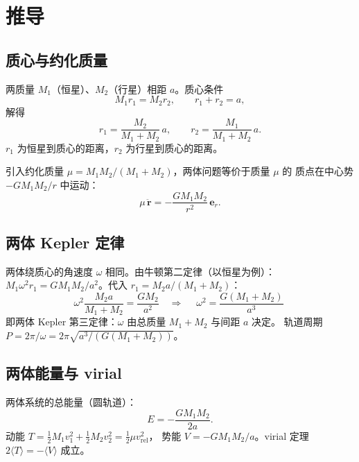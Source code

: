 \documentclass[UTF8,a4paper,11pt]{ctexart}
\begin{document}
\section{推导}
\label{sec:derive}

\subsection{质心与约化质量}
\label{sub:com}

两质量 $M_1$（恒星）、$M_2$（行星）相距 $a$。质心条件
\begin{equation}
  M_1 r_1 = M_2 r_2,\qquad r_1+r_2=a,
  \label{eq:com}
\end{equation}
解得
\begin{equation}
  r_1=\frac{M_2}{M_1+M_2}\,a,\qquad
  r_2=\frac{M_1}{M_1+M_2}\,a.
  \label{eq:r1r2}
\end{equation}
$r_1$ 为恒星到质心的距离，$r_2$ 为行星到质心的距离。

引入约化质量 $\mu=M_1M_2/(M_1+M_2)$，两体问题等价于质量 $\mu$ 的
质点在中心势 $-GM_1M_2/r$ 中运动：
\begin{equation}
  \mu\,\ddot{\boldsymbol r}=-\frac{GM_1M_2}{r^2}\,\boldsymbol e_r.
  \label{eq:reduced}
\end{equation}

\subsection{两体 Kepler 定律}
\label{sub:kepler2}

两体绕质心的角速度 $\omega$ 相同。由牛顿第二定律（以恒星为例）：
$M_1\omega^2 r_1 = GM_1M_2/a^2$。代入 $r_1=M_2 a/(M_1+M_2)$：
\begin{equation}
  \omega^2\frac{M_2 a}{M_1+M_2}=\frac{GM_2}{a^2}
  \quad\Longrightarrow\quad
  \boxed{\;\omega^2=\frac{G(M_1+M_2)}{a^3}\;}
  \label{eq:kepler2}
\end{equation}
即两体 Kepler 第三定律：$\omega$ 由总质量 $M_1+M_2$ 与间距 $a$ 决定。
轨道周期 $P=2\pi/\omega=2\pi\sqrt{a^3/(G(M_1+M_2))}$。

\subsection{两体能量与 virial}
\label{sub:energy2}

两体系统的总能量（圆轨道）：
\begin{equation}
  E = -\frac{GM_1M_2}{2a}.
\end{equation}
动能 $T=\frac12 M_1 v_1^2+\frac12 M_2 v_2^2
=\frac12 \mu v_{\mathrm{rel}}^2$，
势能 $V=-GM_1M_2/a$。virial 定理 $2\langle T\rangle=-\langle V\rangle$ 成立。
\end{document}
